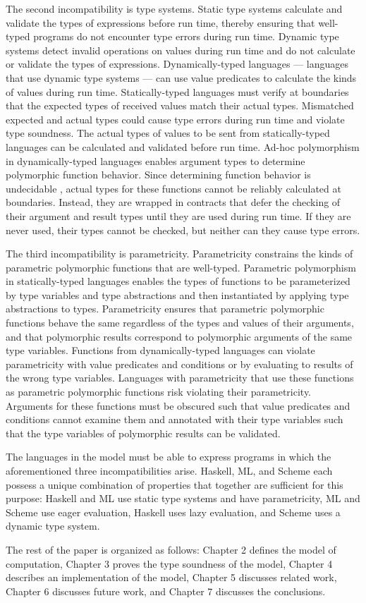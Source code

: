 The second incompatibility is type systems.  Static type systems calculate and validate the types of expressions before run time, thereby ensuring that well-typed programs do not encounter type errors during run time.  Dynamic type systems detect invalid operations on values during run time and do not calculate or validate the types of expressions.  Dynamically-typed languages --- languages that use dynamic type systems --- can use value predicates to calculate the kinds of values during run time.  Statically-typed languages must verify at boundaries that the expected types of received values match their actual types.  Mismatched expected and actual types could cause type errors during run time and violate type soundness.  The actual types of values to be sent from statically-typed languages can be calculated and validated before run time.  Ad-hoc polymorphism in dynamically-typed languages enables argument types to determine polymorphic function behavior.  Since determining function behavior is undecidable \cite{blume04}, actual types for these functions cannot be reliably calculated at boundaries.  Instead, they are wrapped in contracts \cite{findler02} that defer the checking of their argument and result types until they are used during run time.  If they are never used, their types cannot be checked, but neither can they cause type errors.

The third incompatibility is parametricity.  Parametricity constrains the kinds of parametric polymorphic functions that are well-typed.  Parametric polymorphism in statically-typed languages enables the types of functions to be parameterized by type variables and type abstractions and then instantiated by applying type abstractions to types.  Parametricity ensures that parametric polymorphic functions behave the same regardless of the types and values of their arguments, and that polymorphic results correspond to polymorphic arguments of the same type variables.  Functions from dynamically-typed languages can violate parametricity with value predicates and conditions or by evaluating to results of the wrong type variables.  Languages with parametricity that use these functions as parametric polymorphic functions risk violating their parametricity.  Arguments for these functions must be obscured such that value predicates and conditions cannot examine them and annotated with their type variables such that the type variables of polymorphic results can be validated.

The languages in the model must be able to express programs in which the aforementioned three incompatibilities arise.  Haskell, ML, and Scheme each possess a unique combination of properties that together are sufficient for this purpose: Haskell and ML use static type systems and have parametricity, ML and Scheme use eager evaluation, Haskell uses lazy evaluation, and Scheme uses a dynamic type system.

The rest of the paper is organized as follows: Chapter 2 defines the model of computation, Chapter 3 proves the type soundness of the model, Chapter 4 describes an implementation of the model, Chapter 5 discusses related work, Chapter 6 discusses future work, and Chapter 7 discusses the conclusions.